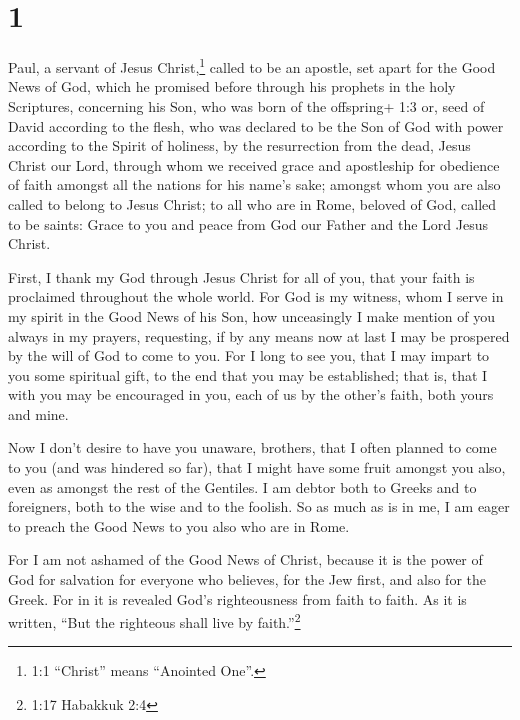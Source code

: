 \hypertarget{section}{%
\section{1}\label{section}}

 Paul, a servant of Jesus Christ,\footnote{1:1 ``Christ''
  means ``Anointed One''.} called to be an apostle, set apart for the
Good News of God,  which he promised before through his
prophets in the holy Scriptures,  concerning his Son, who
was born of the offspring+ 1:3 or, seed of David according to the flesh,
 who was declared to be the Son of God with power according
to the Spirit of holiness, by the resurrection from the dead, Jesus
Christ our Lord,  through whom we received grace and
apostleship for obedience of faith amongst all the nations for his
name's sake;  amongst whom you are also called to belong to
Jesus Christ;  to all who are in Rome, beloved of God,
called to be saints: Grace to you and peace from God our Father and the
Lord Jesus Christ.

 First, I thank my God through Jesus Christ for all of you,
that your faith is proclaimed throughout the whole world. 
For God is my witness, whom I serve in my spirit in the Good News of his
Son, how unceasingly I make mention of you always in my prayers,
 requesting, if by any means now at last I may be prospered
by the will of God to come to you.  For I long to see you,
that I may impart to you some spiritual gift, to the end that you may be
established;  that is, that I with you may be encouraged in
you, each of us by the other's faith, both yours and mine.

 Now I don't desire to have you unaware, brothers, that I
often planned to come to you (and was hindered so far), that I might
have some fruit amongst you also, even as amongst the rest of the
Gentiles.  I am debtor both to Greeks and to foreigners,
both to the wise and to the foolish.  So as much as is in
me, I am eager to preach the Good News to you also who are in Rome.

 For I am not ashamed of the Good News of Christ, because
it is the power of God for salvation for everyone who believes, for the
Jew first, and also for the Greek.  For in it is revealed
God's righteousness from faith to faith. As it is written, ``But the
righteous shall live by faith.''\footnote{1:17 Habakkuk 2:4}

